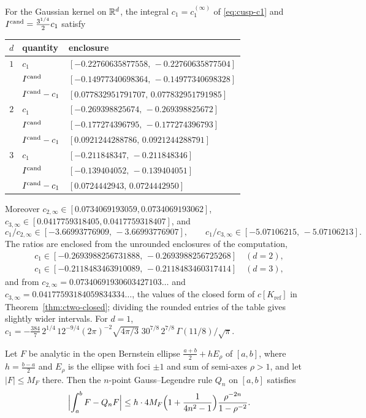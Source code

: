 \begin{theorem}\label{thm:cusp-enclosure}
For the Gaussian kernel on $\mathbb R^d$, the integral $c_1=c_1^{(\infty)}$ of \eqref{eq:cusp-c1} and $I^{\mathrm{cand}}=\frac{3^{1/4}}2c_1$ satisfy
\begin{center}
\begin{tabular}{@{}cll@{}}
\toprule
$d$ & quantity & enclosure\\
\midrule
$1$ & $c_1$ & $[-0.22760635877558,\,-0.22760635877504]$\\
 & $I^{\mathrm{cand}}$ & $[-0.14977340698364,\,-0.14977340698328]$\\
 & $I^{\mathrm{cand}}-c_1$ & $[0.077832951791707,\,0.077832951791985]$\\
\midrule
$2$ & $c_1$ & $[-0.269398825674,\,-0.269398825672]$\\
 & $I^{\mathrm{cand}}$ & $[-0.177274396795,\,-0.177274396793]$\\
 & $I^{\mathrm{cand}}-c_1$ & $[0.0921244288786,\,0.0921244288791]$\\
\midrule
$3$ & $c_1$ & $[-0.211848347,\,-0.211848346]$\\
 & $I^{\mathrm{cand}}$ & $[-0.139404052,\,-0.139404051]$\\
 & $I^{\mathrm{cand}}-c_1$ & $[0.0724442943,\,0.0724442950]$\\
\bottomrule
\end{tabular}
\end{center}
Moreover $c_{2,\infty}\in[0.0734069193059,0.0734069193062]$, $c_{3,\infty}\in[0.0417759318405,0.0417759318407]$, and
\[
c_1/c_{2,\infty}\in[-3.66993776909,\,-3.66993776907],\qquad c_1/c_{3,\infty}\in[-5.07106215,\,-5.07106213].
\]
The ratios are enclosed from the unrounded enclosures of the computation,
\[
\begin{gathered}
c_1\in[-0.2693988256731888,\,-0.2693988256725268]\quad(d=2),\\
c_1\in[-0.2118483463910089,\,-0.2118483460317414]\quad(d=3),
\end{gathered}
\]
and from $c_{2,\infty}=0.07340691930603427103\ldots$ and $c_{3,\infty}=0.04177593184059834334\ldots$, the values of the closed form of $c[K_{\mathrm{ref}}]$ in Theorem~\ref{thm:ctwo-closed}; dividing the rounded entries of the table gives slightly wider intervals.
For $d=1$, $c_1=-\frac{384}7\,2^{1/4}\,12^{-9/4}(2\pi)^{-2}\sqrt{4\pi/3}\;30^{7/8}\,2^{7/8}\,\Gamma(11/8)/\sqrt\pi$.
\end{theorem}

\begin{lemma}\label{lem:cusp-quad}
Let $F$ be analytic in the open Bernstein ellipse $\frac{a+b}2+hE_\rho$ of $[a,b]$, where $h=\frac{b-a}2$ and $E_\rho$ is the ellipse with foci $\pm1$ and sum of semi-axes $\rho>1$, and let $|F|\le M_F$ there. Then the $n$-point Gauss--Legendre rule $Q_n$ on $[a,b]$ satisfies
\[
\Bigl|\int_a^bF-Q_nF\Bigr|\le h\cdot4M_F\Bigl(1+\frac1{4n^2-1}\Bigr)\frac{\rho^{-2n}}{1-\rho^{-2}} .
\]
\end{lemma}

